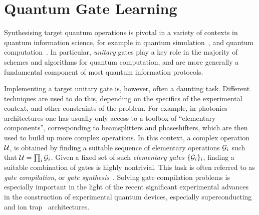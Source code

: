 
\chapter{Quantum Gate Learning}
\label{chapter:gate_learning}

Synthesising target quantum operations is pivotal in a variety of contexts in quantum information science, for example in quantum simulation~\cite{feynman1982simulating,lloyd1996universal}, and quantum computation~\cite{deutsch1985quantum,gottesman1998theory,nielsen2002quantum,ladd2010quantum}.
In particular, \emph{unitary} gates play a key role in the majority of schemes and algorithms for quantum computation, and are more generally a fundamental component of most quantum information protocols.

Implementing a target unitary gate is, however, often a daunting task. Different techniques are used to do this, depending on the specifics of the experimental context, and other constraints of the problem.
For example, in photonics architectures one has usually only access to a toolbox of ``elementary components'', corresponding to beamsplitters and phaseshifters, which are then used to build up more complex operations.
In this context, a complex operation ${\mathcal{U}}$, is obtained by finding a suitable sequence of elementary operations ${\mathcal{G}}_i$ such that ${\mathcal{U}}=\prod_i {\mathcal{G}}_i$. Given a fixed set of such \textit{elementary gates} $\{{\mathcal{G}}_i\}_i$, finding a suitable combination of gates is highly nontrivial. This task is often referred to as \textit{gate compilation}, or \textit{gate synthesis}~\cite{mottonen2004quantum,nielsen2006quantum,nakajima2009synthesis,loke2014optqc,loke2016optqc,maslov2017basic,swaddle2017generating,ashouri2018survey}.
Solving gate compilation problems is especially important in the light of the recent significant experimental advances in the construction of experimental quantum devices, especially superconducting~\cite{devoret2013superconducting,arute2019quantum} and ion trap~\cite{blatt2008entangled,debnath2016demonstration} architectures.


